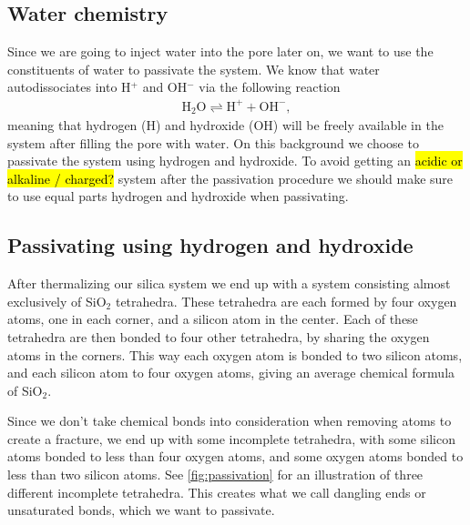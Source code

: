 \subsection{Water chemistry}
Since we are going to inject water into the pore later on, we want to use the constituents of water to passivate the system. We know that water autodissociates into H$^{+}$ and OH$^{-}$ via the following reaction
\begin{align*}
    \text{H}_2\text{O} \rightleftharpoons \text{H}^{+} + \text{OH}^{-},
\end{align*}
meaning that hydrogen (H) and hydroxide (OH) will be freely available in the system after filling the pore with water. On this background we choose to passivate the system using hydrogen and hydroxide. To avoid getting an \hl{acidic or alkaline / charged?} system after the passivation procedure we should make sure to use equal parts hydrogen and hydroxide when passivating.

\subsection{Passivating using hydrogen and hydroxide}
After thermalizing our silica system we end up with a system consisting almost exclusively of SiO$_2$ tetrahedra. These tetrahedra are each formed by four oxygen atoms, one in each corner, and a silicon atom in the center. Each of these tetrahedra are then bonded to four other tetrahedra, by sharing the oxygen atoms in the corners. This way each oxygen atom is bonded to two silicon atoms, and each silicon atom to four oxygen atoms, giving an average chemical formula of SiO$_2$. 

Since we don't take chemical bonds into consideration when removing atoms to create a fracture, we end up with some incomplete tetrahedra, with some silicon atoms bonded to less than four oxygen atoms, and some oxygen atoms bonded to less than two silicon atoms. See \cref{fig:passivation} for an illustration of three different incomplete tetrahedra. This creates what we call dangling ends or unsaturated bonds, which we want to passivate.


